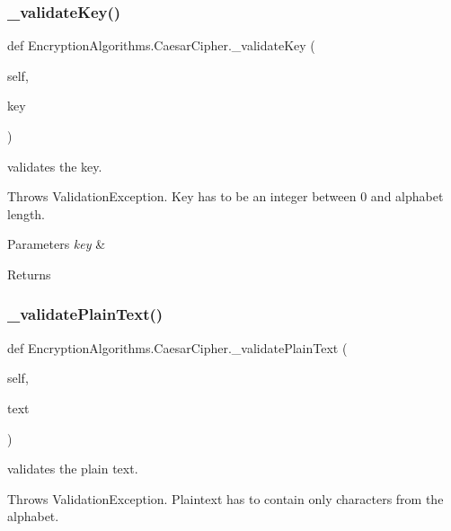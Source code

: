 \subsubsection{\texorpdfstring{\+\_\+validate\+Key()}{\_validateKey()}}
{\footnotesize\ttfamily def Encryption\+Algorithms.\+Caesar\+Cipher.\+\_\+validate\+Key (\begin{DoxyParamCaption}\item[{}]{self,  }\item[{}]{key }\end{DoxyParamCaption})\hspace{0.3cm}{\ttfamily [private]}}



validates the key. 

Throws Validation\+Exception. Key has to be an integer between 0 and alphabet length.


\begin{DoxyParams}{Parameters}
{\em key} & \\
\hline
\end{DoxyParams}
\begin{DoxyReturn}{Returns}

\end{DoxyReturn}
\mbox{\label{classEncryptionAlgorithms_1_1CaesarCipher_a6fe0acdce6b92624ba362c1b14a06e2b}} 
\subsubsection{\texorpdfstring{\+\_\+validate\+Plain\+Text()}{\_validatePlainText()}}
{\footnotesize\ttfamily def Encryption\+Algorithms.\+Caesar\+Cipher.\+\_\+validate\+Plain\+Text (\begin{DoxyParamCaption}\item[{}]{self,  }\item[{}]{text }\end{DoxyParamCaption})\hspace{0.3cm}{\ttfamily [private]}}



validates the plain text. 

Throws Validation\+Exception. Plaintext has to contain only characters from the alphabet.



